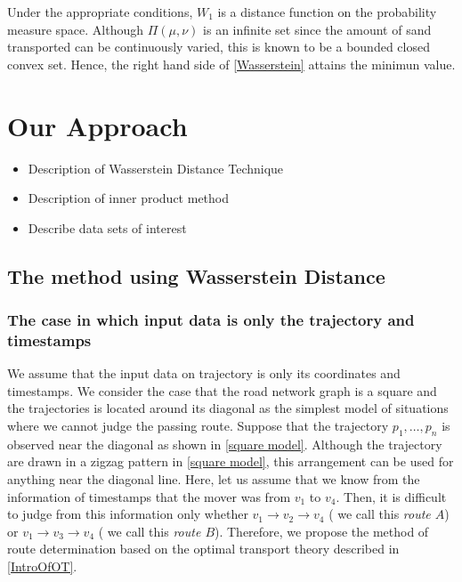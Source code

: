 \documentclass{article}
\numberwithin{equation}{section}
\theoremstyle{definition}
\begin{document}
Under the appropriate conditions, $W_1$ is a distance function on the probability measure space.
Although $\Pi(\mu,\nu)$ is an infinite set since the amount of sand transported can be continuously varied, this is known to be a bounded closed convex set.
Hence, the right hand side of \eqref{Wasserstein} attains the minimun value.



\section{Our Approach}

\begin{itemize}
    \item Description of Wasserstein Distance Technique
    \item Description of inner product method 
    \item Describe data sets of interest 
\end{itemize}

\subsection{The method using Wasserstein Distance}

\subsubsection{The case in which input data is only the trajectory and timestamps} \label{input:tra&time}

We assume that the input data on trajectory is only its coordinates and timestamps.
We {\color{red}consider the case }that the road network graph is a square and the trajectories is located around its diagonal as the simplest model of situations where we cannot judge the passing route.
Suppose that the trajectory $p_1,\ldots,p_n$ is observed near the diagonal as shown in \autoref{square model}.
Although the trajectory are drawn in a zigzag pattern in \autoref{square model}, this arrangement can be used for anything near the diagonal line.
Here, let us assume that we know from the information of timestamps that the mover was from $v_1$ to $v_4$.
Then, it is difficult to judge from this information only whether $v_1\to v_2\to v_4$ ( we call this \emph{route $A$}) or $v_1\to v_3\to v_4$ ( we call this \emph{route $B$}).
Therefore, we propose the method of route determination based on the optimal transport theory described in \autoref{IntroOfOT}.
\end{document}
